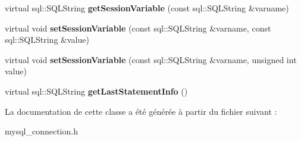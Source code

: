 \begin{DoxyCompactItemize}
\item 
virtual sql\+::\+S\+Q\+L\+String {\bfseries get\+Session\+Variable} (const sql\+::\+S\+Q\+L\+String \&varname)\hypertarget{classsql_1_1mysql_1_1MySQL__Connection_ae35fdfcee5de39dc2ec759bc5b8145be}{}\label{classsql_1_1mysql_1_1MySQL__Connection_ae35fdfcee5de39dc2ec759bc5b8145be}

\item 
virtual void {\bfseries set\+Session\+Variable} (const sql\+::\+S\+Q\+L\+String \&varname, const sql\+::\+S\+Q\+L\+String \&value)\hypertarget{classsql_1_1mysql_1_1MySQL__Connection_a5e3eb3eed3d7092c9d03efd7d52629c2}{}\label{classsql_1_1mysql_1_1MySQL__Connection_a5e3eb3eed3d7092c9d03efd7d52629c2}

\item 
virtual void {\bfseries set\+Session\+Variable} (const sql\+::\+S\+Q\+L\+String \&varname, unsigned int value)\hypertarget{classsql_1_1mysql_1_1MySQL__Connection_ad8a42ed4da0fb3810a7624cc969d7ced}{}\label{classsql_1_1mysql_1_1MySQL__Connection_ad8a42ed4da0fb3810a7624cc969d7ced}

\item 
virtual sql\+::\+S\+Q\+L\+String {\bfseries get\+Last\+Statement\+Info} ()\hypertarget{classsql_1_1mysql_1_1MySQL__Connection_a31744f8fd6beaa9c488f947962c1bae6}{}\label{classsql_1_1mysql_1_1MySQL__Connection_a31744f8fd6beaa9c488f947962c1bae6}

\end{DoxyCompactItemize}


La documentation de cette classe a été générée à partir du fichier suivant \+:\begin{DoxyCompactItemize}
\item 
mysql\+\_\+connection.\+h\end{DoxyCompactItemize}
